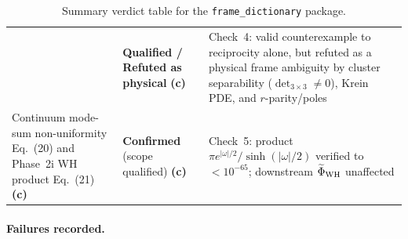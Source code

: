 \documentclass[11pt,a4paper]{article}
\newcommand{\Lc}{\textsf{\textbf{(c)}}\ }
\begin{document}
\begin{table}[ht]
\begin{tabular}{@{}L{5.6cm}L{2.5cm}L{6.2cm}@{}}
 & \textbf{Qualified / Refuted as physical} \Lc & Check~4: valid counterexample to reciprocity alone, but refuted as a physical frame ambiguity by cluster separability ($\det_{3\times 3}\ne 0$), Krein PDE, and $r$-parity/poles\\
Continuum mode-sum non-uniformity Eq.~(20) and Phase~2i WH product Eq.~(21) \Lc
 & \textbf{Confirmed} (scope qualified) \Lc & Check~5: product $\pi e^{|\omega|/2}/\sinh(|\omega|/2)$ verified to $<10^{-65}$; downstream $\widetilde\Phi_{\rm WH}$ unaffected\\\bottomrule
\end{tabular}
\caption{Summary verdict table for the \texttt{frame\_\allowbreak dictionary} package.}\label{tab:verdicts}
\end{table}

\paragraph{Failures recorded.}
\end{document}
